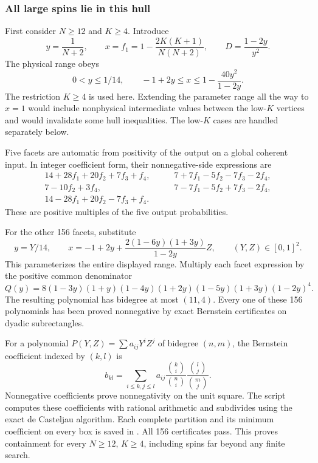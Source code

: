 \documentclass[11pt,a4paper]{article}
\begin{document}
\subsubsection{All large spins lie in this hull}
First consider $N\ge12$ and $K\ge4$. Introduce
\[
 y=\frac1{N+2},\qquad x=f_1=1-\frac{2K(K+1)}{N(N+2)},
 \qquad D=\frac{1-2y}{y^2}.
\]
The physical range obeys
\[
 0<y\le1/14,\qquad
 -1+2y\le x\le1-\frac{40y^2}{1-2y}.
\]
The restriction $K\ge4$ is used here. Extending the parameter range
all the way to $x=1$ would include nonphysical intermediate values
between the low-$K$ vertices and would invalidate some hull inequalities.
The low-$K$ cases are handled separately below.

Five facets are automatic from positivity of the output on a global
coherent input. In integer coefficient form, their nonnegative-side
expressions are
\begin{align*}
 14+28f_1+20f_2+7f_3+f_4,&\qquad
 7+7f_1-5f_2-7f_3-2f_4,\\
 7-10f_2+3f_4,&\qquad
 7-7f_1-5f_2+7f_3-2f_4,\\
 14-28f_1+20f_2-7f_3+f_4.&
\end{align*}
These are positive multiples of the five output probabilities.

For the other 156 facets, substitute
\[
 y=Y/14,\qquad
 x=-1+2y+\frac{2(1-6y)(1+3y)}{1-2y}Z,
                \qquad (Y,Z)\in[0,1]^2.
\]
This parameterizes the entire displayed range. Multiply each facet
expression by the positive common denominator
\[
 Q(y)=8(1-3y)(1+y)(1-4y)(1+2y)(1-5y)(1+3y)(1-2y)^4.
\]
The resulting polynomial has bidegree at most $(11,4)$.
Every one of these 156 polynomials has been proved nonnegative by
exact Bernstein certificates on dyadic subrectangles.

For a polynomial $P(Y,Z)=\sum a_{ij}Y^iZ^j$ of bidegree $(n,m)$,
the Bernstein coefficient indexed by $(k,l)$ is
\[
 b_{kl}=\sum_{i\le k,j\le l}a_{ij}
          \frac{\binom{k}{i}}{\binom{n}{i}}
          \frac{\binom{l}{j}}{\binom{m}{j}}.
\]
Nonnegative coefficients prove nonnegativity on the unit square.
The script  computes these
coefficients with rational arithmetic and subdivides using the exact
de Casteljau algorithm. Each complete partition and its minimum
coefficient on every box is saved in .
All 156 certificates pass. This proves containment for every
$N\ge12$, $K\ge4$, including spins far beyond any finite search.
\end{document}

